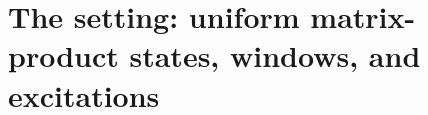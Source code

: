 
\providecommand{\Aloc}{\mathfrak{A}_{\mathrm{loc}}}      %
\providecommand{\Utens}{\mathcal{U}}                     %
\providecommand{\Vac}{\Omega_{\mathrm{vac}}}             %
\providecommand{\Nnull}{\mathcal{N}}                     %
\providecommand{\Ewin}{\mathfrak{E}}                     %
\providecommand{\lamt}{\tilde{\lambda}}                  %
\providecommand{\Cbd}{C_{\partial}}                      %
\providecommand{\gaugerem}{\mathfrak{B}}                 %
\providecommand{\Ept}{\mathcal{E}}                       %
\providecommand{\dcoset}{\mathfrak{d}}                   %
\providecommand{\Fc}{\mathfrak{F}_{c}}                   %
\providecommand{\Fec}{\mathfrak{F}_{\mathrm{ec}}}        %
\providecommand{\Fell}{\mathfrak{F}_{\ell^{1}}}          %
\providecommand{\Aeff}{\A_{\mathrm{eff}}}                %
\providecommand{\hsub}{\mathfrak{h}}                     %
\providecommand{\msub}{\mathfrak{m}}                     %
\providecommand{\liealg}{\mathfrak{g}}                   %

\section{The setting: uniform matrix-product states, windows, and excitations}
\label{sec:mps-setting}

